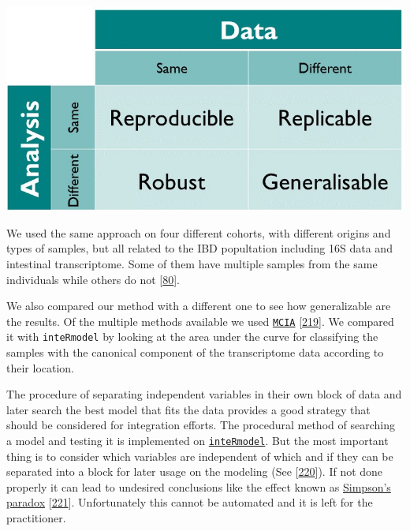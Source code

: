 \documentclass[
  12pt,
  a4paper,
  twoside,
  openright]{book}
\let\origfigure\figure
\let\endorigfigure\endfigure
\renewenvironment{figure}[1][2] {
    \expandafter\origfigure\expandafter[!htp]
} {
    \endorigfigure
}
\begin{document}
\begin{figure}
\includegraphics[width=1\linewidth]{images/turing_way_reproducible-matrix} \caption[Reproducibility matrix]{Reproducibility matrix indicating the terminology used between using the same method and the same data. Figure from The Turing Way: A Handbook for Reproducible Data Science (Version v1.0.1).}\label{fig:reproducible-matrix}
\end{figure}

We used the same approach on four different cohorts, with different origins and types of samples, but all related to the IBD popultation including 16S data and intestinal transcriptome.
Some of them have multiple samples from the same individuals while others do not {[}\protect\hyperlink{ref-hasler_uncoupling_2016}{80}{]}.

We also compared our method with a different one to see how generalizable are the results.
Of the multiple methods available we used \href{https://bioconductor.org/packages/omicade4}{\texttt{MCIA}} {[}\protect\hyperlink{ref-mengMultivariateApproachIntegration2014}{219}{]}.
We compared it with \texttt{inteRmodel} by looking at the area under the curve for classifying the samples with the canonical component of the transcriptome data according to their location.

The procedure of separating independent variables in their own block of data and later search the best model that fits the data provides a good strategy that should be considered for integration efforts.
The procedural method of searching a model and testing it is implemented on \href{https://llrs.github.io/inteRmodel/}{\texttt{inteRmodel}}.
But the most important thing is to consider which variables are independent of which and if they can be separated into a block for later usage on the modeling (See {[}\protect\hyperlink{ref-pearl2011}{220}{]}).
If not done properly it can lead to undesired conclusions like the effect known as \href{https://en.wikipedia.org/wiki/Simpson\%27s_paradox}{Simpson's paradox} {[}\protect\hyperlink{ref-simpson1951}{221}{]}.
Unfortunately this cannot be automated and it is left for the practitioner.
\end{document}
